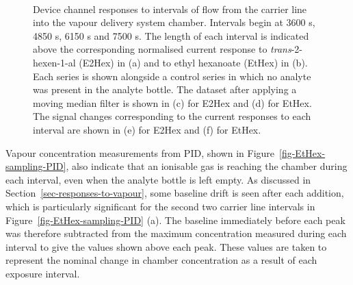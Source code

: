 \documentclass[
  a4paper,
]{scrbook}
\begin{document}
\begin{figure}
\begin{minipage}[t]{0.45\linewidth}
{{}

}

\end{minipage}%
%
\begin{minipage}[t]{0.01\linewidth}

{\centering 

~

}

\end{minipage}%

\caption[Device channel responses to intervals of
\emph{trans}-2-hexen-1-al (E2Hex) or ethyl hexanoate (EtHex) flow from
the carrier line into the vapour delivery system chamber, with and
without filtering, and compared with a control series where no analyte
was present in the analyte bottle.]{\label{fig-EtHex-sampling}Device
channel responses to intervals of flow from the carrier line into the
vapour delivery system chamber. Intervals begin at 3600 s, 4850 s, 6150
s and 7500 s. The length of each interval is indicated above the
corresponding normalised current response to \emph{trans}-2-hexen-1-al
(E2Hex) in (a) and to ethyl hexanoate (EtHex) in (b). Each series is
shown alongside a control series in which no analyte was present in the
analyte bottle. The dataset after applying a moving median filter is
shown in (c) for E2Hex and (d) for EtHex. The signal changes
corresponding to the current responses to each interval are shown in (e)
for E2Hex and (f) for EtHex.}

\end{figure}

Vapour concentration measurements from PID, shown in
Figure~\ref{fig-EtHex-sampling-PID}, also indicate that an ionisable gas
is reaching the chamber during each interval, even when the analyte
bottle is left empty. As discussed in
Section~\ref{sec-responses-to-vapour}, some baseline drift is seen after
each addition, which is particularly significant for the second two
carrier line intervals in Figure~\ref{fig-EtHex-sampling-PID} (a). The
baseline immediately before each peak was therefore subtracted from the
maximum concentration measured during each interval to give the values
shown above each peak. These values are taken to represent the nominal
change in chamber concentration as a result of each exposure interval.
\end{document}
